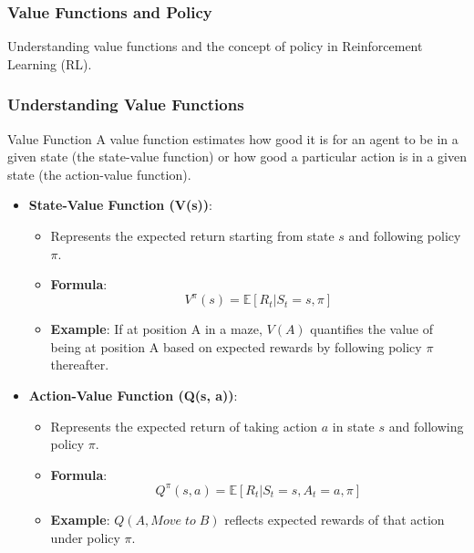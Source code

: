 \documentclass[aspectratio=169]{beamer}
\begin{document}
\begin{frame}[fragile]
    \frametitle{Value Functions and Policy}
    Understanding value functions and the concept of policy in Reinforcement Learning (RL).
\end{frame}

\begin{frame}[fragile]
    \frametitle{Understanding Value Functions}
    \begin{block}{Value Function}
        A value function estimates how good it is for an agent to be in a given state (the state-value function) or how good a particular action is in a given state (the action-value function).
    \end{block}
    
    \begin{itemize}
        \item \textbf{State-Value Function (V(s))}:
        \begin{itemize}
            \item Represents the expected return starting from state \(s\) and following policy \(\pi\).
            \item \textbf{Formula}:
            \begin{equation}
                V^{\pi}(s) = \mathbb{E}[R_t | S_t = s, \pi]
            \end{equation}
            \item \textbf{Example}: If at position A in a maze, \(V(A)\) quantifies the value of being at position A based on expected rewards by following policy \(\pi\) thereafter.
        \end{itemize}
        
        \item \textbf{Action-Value Function (Q(s, a))}:
        \begin{itemize}
            \item Represents the expected return of taking action \(a\) in state \(s\) and following policy \(\pi\).
            \item \textbf{Formula}:
            \begin{equation}
                Q^{\pi}(s, a) = \mathbb{E}[R_t | S_t = s, A_t = a, \pi]
            \end{equation}
            \item \textbf{Example}: \(Q(A, Move \; to \; B)\) reflects expected rewards of that action under policy \(\pi\).
        \end{itemize}
    \end{itemize}
\end{frame}
\end{document}
